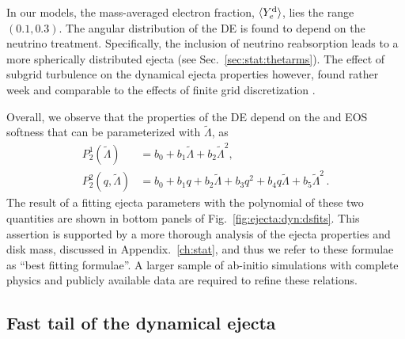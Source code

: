 In our models, the mass-averaged electron fraction, $\langle Y^{\text{d}}_{e}\rangle$, 
lies the range $(0.1, 0.3)$.
The angular distribution of the \ac{DE} is found to depend 
on the neutrino treatment. Specifically, the inclusion of 
neutrino reabsorption leads to a more spherically distributed ejecta
(see Sec.~\ref{sec:stat:thetarms}).
The effect of subgrid turbulence on the dynamical ejecta properties however,
found rather week and comparable to the effects of finite grid discretization 
\citep{Bernuzzi:2020txg,Radice:2020ids}.

Overall, we observe that the properties of the \ac{DE} depend on the \mr{} and 
\ac{EOS} softness that can be parameterized with $\tilde{\Lambda}$, as 
%
\begin{align}\label{eq:polyfit2}
P_2 ^1(\tilde{\Lambda}) &= b_0 + b_1\tilde\Lambda + b_2 \tilde\Lambda^2, \\\label{eq:polyfit22}
P_2 ^2(q,\tilde\Lambda) &= b_0 + b_1q + b_2\tilde\Lambda + b_3q ^2 +  b_4 q \tilde\Lambda + b_5\tilde\Lambda^2 \, .
\end{align}
%
The result of a fitting ejecta parameters with the polynomial of these two quantities 
are shown in bottom panels of Fig.~\ref{fig:ejecta:dyn:dsfits}.
%
This assertion is supported by a more thorough analysis of the ejecta 
properties and disk mass, discussed in Appendix.~\ref{ch:stat}, 
and thus we refer to these formulae as ``best fitting formulae''.
%
A larger sample of ab-initio simulations with complete physics and 
publicly available data are required to refine these relations.




\subsection{Fast tail of the dynamical ejecta} \label{sec:bns_sims:fast_de}

